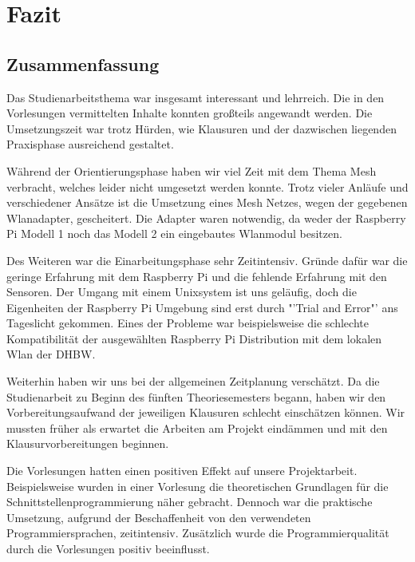 \chapter{Fazit}
%
\section{Zusammenfassung}
	Das Studienarbeitsthema war insgesamt interessant und lehrreich. Die in den Vorlesungen vermittelten Inhalte konnten großteils angewandt werden. Die Umsetzungszeit war trotz Hürden, wie Klausuren und der dazwischen liegenden Praxisphase ausreichend gestaltet. 
	
	Während der	Orientierungsphase haben wir viel Zeit mit dem Thema Mesh verbracht, welches leider nicht umgesetzt werden konnte. Trotz vieler Anläufe und verschiedener Ansätze ist die Umsetzung eines Mesh Netzes, wegen der gegebenen Wlanadapter, gescheitert. Die Adapter waren notwendig, da weder der Raspberry Pi Modell 1 noch das Modell 2 ein eingebautes Wlanmodul besitzen. 
	
	Des Weiteren war die Einarbeitungsphase sehr Zeitintensiv. Gründe dafür war die geringe Erfahrung mit dem Raspberry Pi und die fehlende Erfahrung mit den Sensoren. Der Umgang mit einem Unixsystem ist uns geläufig, doch die Eigenheiten der Raspberry Pi Umgebung sind erst durch "'Trial and Error"' ans Tageslicht gekommen. Eines der Probleme war beispielsweise die schlechte Kompatibilität der ausgewählten Raspberry Pi Distribution mit dem lokalen Wlan der DHBW. 
	
	Weiterhin haben wir uns bei der allgemeinen Zeitplanung verschätzt. Da die Studienarbeit zu Beginn des fünften Theoriesemesters begann, haben wir den Vorbereitungsaufwand der jeweiligen Klausuren schlecht einschätzen können. Wir mussten früher als erwartet die Arbeiten am Projekt eindämmen und mit den Klausurvorbereitungen beginnen. 
	
	Die Vorlesungen hatten einen positiven Effekt auf unsere Projektarbeit. Beispielsweise wurden in einer Vorlesung die theoretischen Grundlagen für die Schnittstellenprogrammierung näher gebracht. Dennoch war die praktische Umsetzung, aufgrund der Beschaffenheit von den verwendeten Programmiersprachen, zeitintensiv. Zusätzlich wurde die Programmierqualität durch die Vorlesungen positiv beeinflusst.
	
